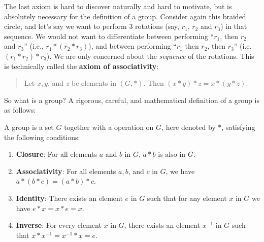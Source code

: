 \newpage

\begin{figure}
    \centering
\end{figure}

The last axiom is hard to discover naturally and hard to motivate, but is absolutely necessary for the definition of a group. Consider again this braided circle, and let's say we want to perform 3 rotations (say, $r_1$, $r_2$ and $r_3$) in that sequence. We would not want to differentiate between performing ``$r_1$, then $r_2$ and $r_3$'' (i.e., $r_1 \ast (r_2 \ast r_3)$), and between performing ``$r_1$ then $r_2$, then $r_3$'' (i.e. $(r_1 \ast r_2) \ast r_3$). We are only concerned about the \textit{sequence} of the rotations. This is technically called the \textbf{axiom of associativity}:
\begin{quote}
    Let $x, y$, and $z$ be elements in $(G, \ast)$. Then $(x \ast y) \ast z = x \ast (y \ast z)$.
\end{quote}

So what is a group? A rigorous, careful, and mathematical definition of a group is as follows:
\begin{definition}
    A group is a set $G$ together with a operation on $G$, here denoted by $\ast$, satisfying the following conditions:
    \begin{enumerate}
        \item \textbf{Closure}: For all elements $a$ and $b$ in $G$, $a \ast b$ is also in $G$.
        \item \textbf{Associativity}: For all elements $a, b$, and $c$ in $G$, we have $a \ast (b \ast c) = (a \ast b) \ast c$.
        \item \textbf{Identity}: There exists an element $e$ in $G$ such that for any element $x$ in $G$ we have $e \ast x = x \ast e = x$.
        \item \textbf{Inverse}: For every element $x$ in $G$, there exists an element $x^{-1}$ in $G$ such that $x \ast x^{-1} = x^{-1} \ast x = e$.
    \end{enumerate}
\end{definition}

